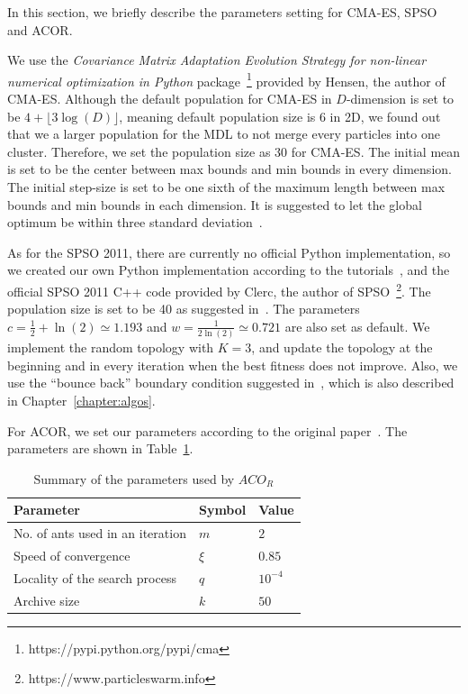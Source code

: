 In this section, we briefly describe the parameters setting for CMA-ES, SPSO and ACOR.

We use the \textit{Covariance Matrix Adaptation Evolution Strategy for non-linear numerical optimization in Python} package~\footnote{https://pypi.python.org/pypi/cma} provided by Hensen, the author of CMA-ES.
Although the default population for CMA-ES in $D$-dimension is set to be $4 + \lfloor3\log(D)\rfloor$, meaning default population size is 6 in 2D,
we found out that we a larger population for the MDL to not merge every particles into one cluster.
Therefore, we set the population size as 30 for CMA-ES.
The initial mean is set to be the center between max bounds and min bounds in every dimension.
The initial step-size is set to be one sixth of the maximum length between max bounds and min bounds in each dimension. 
It is suggested to let the global optimum be within three standard deviation~\cite{Hansen:2006:CMA_ES_review}.

As for the SPSO 2011, there are currently no official Python implementation, 
so we created our own Python implementation according to the tutorials~\cite{Clerc:2012:SPSO2011},
and the official SPSO 2011 C++ code provided by Clerc, the author of SPSO~\footnote{https://www.particleswarm.info}.
The population size is set to be 40 as suggested in~\cite{Clerc:2012:SPSO2011}.
The parameters $c = \frac{1}{2} + \ln(2) \simeq 1.193$ and $w = \frac{1}{2\ln(2)} \simeq 0.721$ are also set as default.
We implement the random topology with $K = 3$,
and update the topology at the beginning and in every iteration when the best fitness does not improve.
Also, we use the ``bounce back'' boundary condition suggested in~\cite{Clerc:2012:SPSO2011}, which is also described in Chapter~\ref{chapter:algos}.

For ACOR, we set our parameters according to the original paper~\cite{Socha:2008:ACOR}. 
The parameters are shown in Table~\ref{table:ACOR_parameters}.

\begin{table}%
\centering
\label{table:ACOR_parameters}
\begin{tabular}{lll}
\hline
Parameter                        & Symbol   & Value          \\ \hline
No. of ants used in an iteration & $m$      & $2$            \\
Speed of convergence             & $\xi$    & $0.85$         \\
Locality of the search process   & $q$      & $10^{-4}$      \\
Archive size                     & $k$      & $50$           \\ \hline
\end{tabular}
\caption{Summary of the parameters used by $ACO_R$}
\end{table}

